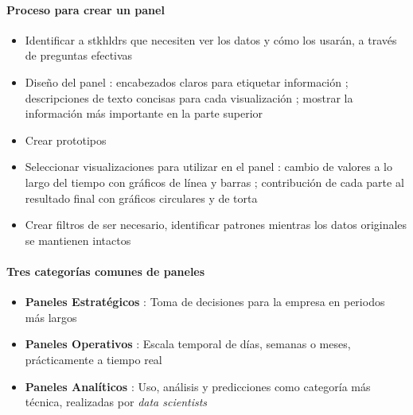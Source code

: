 \paragraph{Proceso para crear un panel}
    \begin{itemize}
        \item {Identificar a \Gls{stkhldrs} que necesiten ver los datos y cómo los usarán, a través de preguntas efectivas}
        \item {Diseño del panel : encabezados claros para etiquetar información ; descripciones de texto concisas para cada visualización ; mostrar la información más importante en la parte superior}
        \item {Crear prototipos}
        \item {Seleccionar visualizaciones para utilizar en el panel : cambio de valores a lo largo del tiempo con gráficos de línea y barras ; contribución de cada parte al resultado final con gráficos circulares y de torta}
        \item {Crear filtros de ser necesario, identificar patrones mientras los datos originales se mantienen intactos}
    \end{itemize}
\paragraph{Tres categorías comunes de paneles}
    \begin{itemize}
        \item {\textbf{Paneles Estratégicos} : Toma de decisiones para la empresa en periodos más largos}
        \item {\textbf{Paneles Operativos} : Escala temporal de días, semanas o meses, prácticamente a tiempo real}
        \item {\textbf{Paneles Analíticos} : Uso, análisis y predicciones como categoría más técnica, realizadas por \textit{data scientists}}
    \end{itemize}